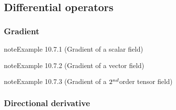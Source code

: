 \documentclass[letterpaper,10pt,english]{jupyterBook}
\begin{document}
\subsection{Differential operators}
\label{\detokenize{ch/tensor-algebra-calculus/calculus-euclidean-spherical:differential-operators}}\label{\detokenize{ch/tensor-algebra-calculus/calculus-euclidean-spherical:tensor-calculus-spherical-differential-operators}}

\subsubsection{Gradient}
\label{\detokenize{ch/tensor-algebra-calculus/calculus-euclidean-spherical:gradient}}\label{\detokenize{ch/tensor-algebra-calculus/calculus-euclidean-spherical:tensor-calculus-spherical-differential-operators-gradient}}\label{ch/tensor-algebra-calculus/calculus-euclidean-spherical:example-0}
\begin{sphinxadmonition}{note}{Example 10.7.1 (Gradient of a scalar field)}


\end{sphinxadmonition}
\label{ch/tensor-algebra-calculus/calculus-euclidean-spherical:example-1}
\begin{sphinxadmonition}{note}{Example 10.7.2 (Gradient of a vector field)}


\end{sphinxadmonition}
\label{ch/tensor-algebra-calculus/calculus-euclidean-spherical:example-2}
\begin{sphinxadmonition}{note}{Example 10.7.3 (Gradient of a \protect\(2^{nd}\protect\)\sphinxhyphen{}order tensor field)}


\end{sphinxadmonition}


\subsubsection{Directional derivative}
\label{\detokenize{ch/tensor-algebra-calculus/calculus-euclidean-spherical:directional-derivative}}\label{\detokenize{ch/tensor-algebra-calculus/calculus-euclidean-spherical:tensor-calculus-spherical-differential-operators-directional-der}}
\end{document}
